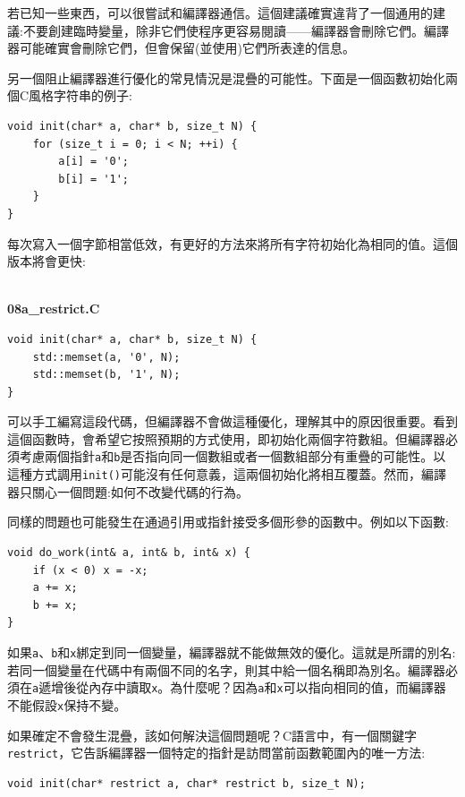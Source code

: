 若已知一些東西，可以很嘗試和編譯器通信。這個建議確實違背了一個通用的建議:不要創建臨時變量，除非它們使程序更容易閱讀——編譯器會刪除它們。編譯器可能確實會刪除它們，但會保留(並使用)它們所表達的信息。

另一個阻止編譯器進行優化的常見情況是混疊的可能性。下面是一個函數初始化兩個C風格字符串的例子:

\begin{lstlisting}[style=styleCXX]
void init(char* a, char* b, size_t N) {
	for (size_t i = 0; i < N; ++i) {
		a[i] = '0';
		b[i] = '1';
	}
}

\end{lstlisting}

每次寫入一個字節相當低效，有更好的方法來將所有字符初始化為相同的值。這個版本將會更快:

\hspace*{\fill} \\ %
\noindent
\textbf{08a\_restrict.C}
\begin{lstlisting}[style=styleCXX]
void init(char* a, char* b, size_t N) {
	std::memset(a, '0', N);
	std::memset(b, '1', N);
}
\end{lstlisting}

可以手工編寫這段代碼，但編譯器不會做這種優化，理解其中的原因很重要。看到這個函數時，會希望它按照預期的方式使用，即初始化兩個字符數組。但編譯器必須考慮兩個指針\texttt{a}和\texttt{b}是否指向同一個數組或者一個數組部分有重疊的可能性。以這種方式調用\texttt{init()}可能沒有任何意義，這兩個初始化將相互覆蓋。然而，編譯器只關心一個問題:如何不改變代碼的行為。 

同樣的問題也可能發生在通過引用或指針接受多個形參的函數中。例如以下函數:

\begin{lstlisting}[style=styleCXX]
void do_work(int& a, int& b, int& x) {
	if (x < 0) x = -x;
	a += x;
	b += x;
}
\end{lstlisting}

如果\texttt{a}、\texttt{b}和\texttt{x}綁定到同一個變量，編譯器就不能做無效的優化。這就是所謂的別名:若同一個變量在代碼中有兩個不同的名字，則其中給一個名稱即為別名。編譯器必須在\texttt{a}遞增後從內存中讀取\texttt{x}。為什麼呢？因為\texttt{a}和\texttt{x}可以指向相同的值，而編譯器不能假設\texttt{x}保持不變。

如果確定不會發生混疊，該如何解決這個問題呢？C語言中，有一個關鍵字\texttt{restrict}，它告訴編譯器一個特定的指針是訪問當前函數範圍內的唯一方法:

\begin{lstlisting}[style=styleCXX]
void init(char* restrict a, char* restrict b, size_t N);
\end{lstlisting}

